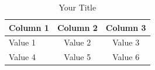 \documentclass{article}
\begin{document}
\begin{table}[htbp]
  \centering
  \caption{Your Title}
  \label{tab:label}
  \begin{tabular}{lcc}
    \hline
    \textbf{Column 1} & \textbf{Column 2} & \textbf{Column 3} \\
    \hline
    Value 1 & Value 2 & Value 3 \\
    Value 4 & Value 5 & Value 6 \\
    \hline
  \end{tabular}
\end{table}
\end{document}
